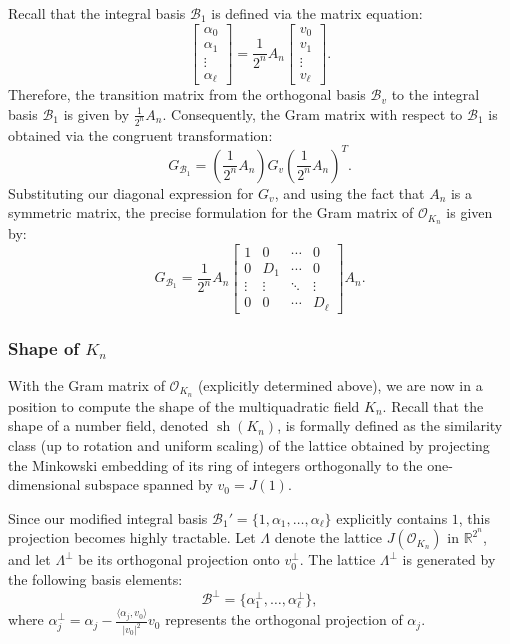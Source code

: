 \documentclass{amsart}
\newcommand{\R}{\mathbb{R}}
\theoremstyle{plain}
\theoremstyle{definition}
\theoremstyle{remark}
\numberwithin{equation}{section}
\begin{document}
\vspace{0.3cm}

Recall that the integral basis $\mathcal{B}_1$ is defined via the matrix equation:$$    \begin{bmatrix}
        \alpha_0 \\ \alpha_1 \\ \vdots \\ \alpha_{\ell}
    \end{bmatrix} 
    = \frac{1}{2^n} A_n \begin{bmatrix}
        v_0 \\ v_1 \\ \vdots \\ v_{\ell}
    \end{bmatrix}.$$Therefore, the transition matrix from the orthogonal basis $\mathcal{B}_v$ to the integral basis $\mathcal{B}_1$ is given by $\frac{1}{2^n} A_n$. Consequently, the Gram matrix with respect to $\mathcal{B}_1$ is obtained via the congruent transformation:$$    G_{\mathcal{B}_1} = \left(\frac{1}{2^n} A_n\right) G_v \left(\frac{1}{2^n} A_n\right)^T.$$Substituting our diagonal expression for $G_v$, and using the fact that $A_n$ is a symmetric matrix, the precise formulation for the Gram matrix of $\mathcal{O}_{K_n}$ is given by:
\[ 
    G_{\mathcal{B}_1} = \frac{1}{2^n} A_n \begin{bmatrix}
        1 & 0 & \cdots & 0 \\
        0 & D_1 & \cdots & 0 \\
        \vdots & \vdots & \ddots & \vdots \\
        0 & 0 & \cdots & D_{\ell}
    \end{bmatrix} A_n.
\]

\subsubsection*{Shape of \texorpdfstring{$K_n$}{Kn}}

With the Gram matrix of $\mathcal{O}_{K_n}$ (explicitly determined above), we are now in a position to compute the shape of the multiquadratic field $K_n$. Recall that the shape of a number field, denoted $\operatorname{sh}(K_n)$, is formally defined as the similarity class (up to rotation and uniform scaling) of the lattice obtained by projecting the Minkowski embedding of its ring of integers orthogonally to the one-dimensional subspace spanned by $v_0 = J(1)$. 

Since our modified integral basis $\mathcal{B}_1' = \{1, \alpha_1, \ldots, \alpha_{\ell}\}$ explicitly contains $1$, this projection becomes highly tractable. Let $\Lambda$ denote the lattice $J(\mathcal{O}_{K_n})$ in $\R^{2^n}$, and let $\Lambda^\perp$ be its orthogonal projection onto $v_0^\perp$. The lattice $\Lambda^\perp$ is generated by the following basis elements:
\[
    \mathcal{B}^\perp = \{\alpha_1^\perp, \ldots, \alpha_{\ell}^\perp\},
\]
where $\alpha_j^\perp = \alpha_j - \frac{\langle \alpha_j, v_0 \rangle}{|v_0|^2} v_0$ represents the orthogonal projection of $\alpha_j$. 
\end{document}
